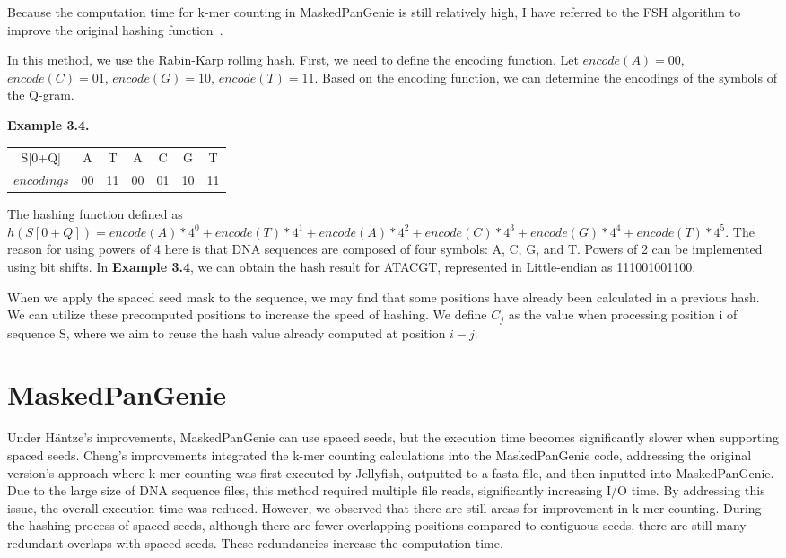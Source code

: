 \documentclass[PhD]{PHlab-thesis}
\begin{document}
Because the computation time for k-mer counting in MaskedPanGenie is still relatively high, I have referred to the FSH algorithm to improve the original hashing function~\cite{FSH}.

In this method, we use the Rabin-Karp rolling hash. First, we need to define the encoding function. Let $encode(A)=00$, $encode(C)=01$, $encode(G)=10$, $encode(T)=11$. Based on the encoding function, we can determine the encodings of the symbols of the Q-gram. 

\textbf{Example 3.4.}
\begin{center}   
\begin{tabular}{ccccccc}
S[0+Q] & A & T & A & C & G & T\\
$encodings$ & 00 & 11 & 00 & 01 & 10 & 11\\
\end{tabular}
\end{center}
\vspace{1em}

The hashing function defined as $h(S[0+Q]) = encode(A)*4^0+encode(T)*4^1+encode(A)*4^2+encode(C)*4^3+encode(G)*4^4+encode(T)*4^5$. The reason for using powers of 4 here is that DNA sequences are composed of four symbols: A, C, G, and T. Powers of 2 can be implemented using bit shifts. In \textbf{Example 3.4}, we can obtain the hash result for ATACGT, represented in Little-endian as 111001001100.

When we apply the spaced seed mask to the sequence, we may find that some positions have already been calculated in a previous hash. We can utilize these precomputed positions to increase the speed of hashing. We define  $C_j$  as the value when processing position i of sequence S, where we aim to reuse the hash value already computed at position  $i-j$.  

\section{MaskedPanGenie}
Under Häntze's improvements, MaskedPanGenie can use spaced seeds, but the execution time becomes significantly slower when supporting spaced seeds. Cheng's improvements integrated the k-mer counting calculations into the MaskedPanGenie code, addressing the original version's approach where k-mer counting was first executed by Jellyfish, outputted to a fasta file, and then inputted into MaskedPanGenie. Due to the large size of DNA sequence files, this method required multiple file reads, significantly increasing I/O time. By addressing this issue, the overall execution time was reduced. However, we observed that there are still areas for improvement in k-mer counting. During the hashing process of spaced seeds, although there are fewer overlapping positions compared to contiguous seeds, there are still many redundant overlaps with spaced seeds. These redundancies increase the computation time.
\end{document}

